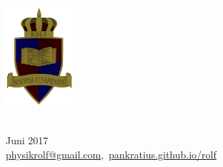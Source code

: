 \documentclass[a4paper]{article}
\begin{document}
	\vspace*{-2cm}
	\parbox{4cm}{\includegraphics[width=2.5cm]{../images/ROLF4.png}}
	\parbox{10.6cm}{ \\ Juni 2017 \\ \href{mailto:physikrolf@gmail.com}{physikrolf@gmail.com},~\url{pankratius.github.io/rolf}\\ \vspace*{-.5cm} }
	
	

\thispagestyle{empty}

\noindent



\end{document}
